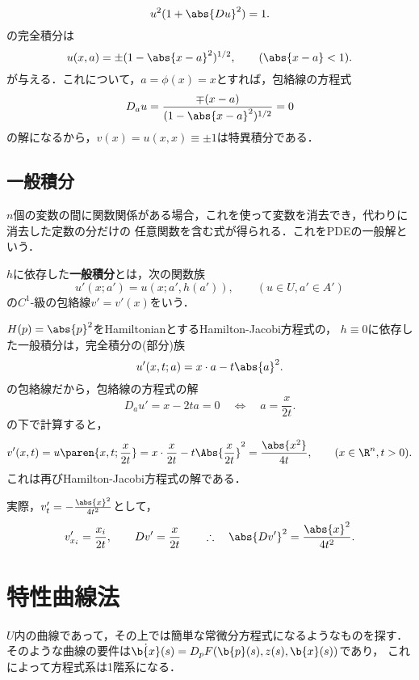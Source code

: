 \documentclass[uplatex,dvipdfmx]{jsreport}
\begin{document}
\begin{example}
    \[u^2(1+\abs{Du}^2)=1.\]
    の完全積分は
    \[u(x,a)=\pm(1-\abs{x-a}^2)^{1/2},\qquad(\abs{x-a}<1).\]
    が与える．これについて，$a=\phi(x)=x$とすれば，包絡線の方程式
    \[D_au=\frac{\mp(x-a)}{(1-\abs{x-a}^2)^{1/2}}=0\]
    の解になるから，$v(x)=u(x,x)\equiv\pm1$は特異積分である．
\end{example}

\subsection{一般積分}

\begin{tcolorbox}[colframe=ForestGreen, colback=ForestGreen!10!white,breakable,colbacktitle=ForestGreen!40!white,coltitle=black,fonttitle=\bfseries\sffamily,
title=]
    $n$個の変数の間に関数関係がある場合，これを使って変数を消去でき，代わりに消去した定数の分だけの
    任意関数を含む式が得られる．これをPDEの一般解という．
\end{tcolorbox}

\begin{definition}
    $h$に依存した\textbf{一般積分}とは，次の関数族
    \[u'(x;a')=u(x;a',h(a')),\qquad(u\in U,a'\in A')\]
    の$C^1$-級の包絡線$v'=v'(x)$をいう．
\end{definition}

\begin{example}
    $H(p)=\abs{p}^2$をHamiltonianとするHamilton-Jacobi方程式の，
    $h\equiv0$に依存した一般積分は，完全積分の(部分)族
    \[u'(x,t;a)=x\cdot a-t\abs{a}^2.\]
    の包絡線だから，包絡線の方程式の解
    \[D_au'=x-2ta=0\quad\Leftrightarrow\quad a=\frac{x}{2t}.\]
    の下で計算すると，
    \[v'(x,t)=u\paren{x,t;\frac{x}{2t}}=x\cdot\frac{x}{2t}-t\Abs{\frac{x}{2t}}^2=\frac{\abs{x^2}}{4t},\qquad(x\in\R^n,t>0).\]
    これは再びHamilton-Jacobi方程式の解である．
\end{example}
\begin{Proof}[［確認］]
    実際，$v_t'=-\frac{\abs{x}^2}{4t^2}$として，
    \[v'_{x_i}=\frac{x_i}{2t},\qquad Dv'=\frac{x}{2t}\qquad\therefore\quad\abs{Dv'}^2=\frac{\abs{x}^2}{4t^2}.\]
\end{Proof}

\section{特性曲線法}

\begin{tcolorbox}[colframe=ForestGreen, colback=ForestGreen!10!white,breakable,colbacktitle=ForestGreen!40!white,coltitle=black,fonttitle=\bfseries\sffamily,
title=]
    $U$内の曲線であって，その上では簡単な常微分方程式になるようなものを探す．
    そのような曲線の要件は$\dot{\b{x}}(s)=D_pF(\b{p}(s),z(s),\b{x}(s))$であり，
    これによって方程式系は1階系になる．
\end{tcolorbox}
\end{document}
